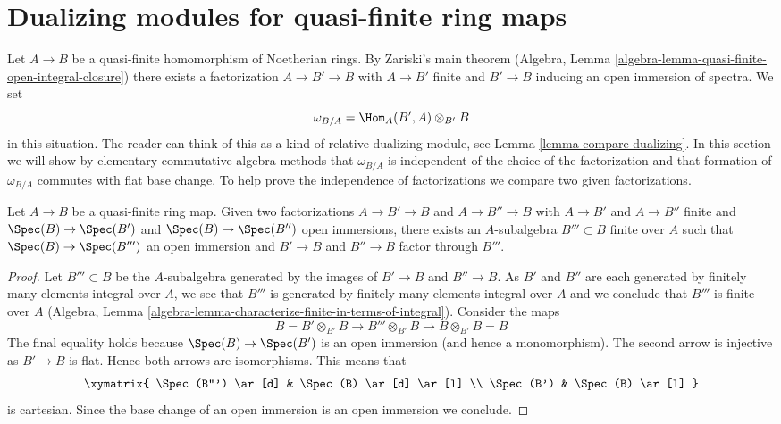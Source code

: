\section{Dualizing modules for quasi-finite ring maps}
\label{section-quasi-finite-dualizing}

\noindent
Let $A \to B$ be a quasi-finite homomorphism of Noetherian rings. By
Zariski's main theorem
(Algebra, Lemma \ref{algebra-lemma-quasi-finite-open-integral-closure})
there exists a factorization $A \to B' \to B$ with
$A \to B'$ finite and $B' \to B$ inducing an open immersion of spectra.
We set
\begin{equation}
\label{equation-dualizing}
\omega_{B/A} = \Hom_A(B', A) \otimes_{B'} B
\end{equation}
in this situation. The reader can think of this as a kind of relative
dualizing module, see Lemma \ref{lemma-compare-dualizing}.
In this section we will show by elementary commutative algebra methods
that $\omega_{B/A}$ is independent of the choice of the factorization
and that formation of $\omega_{B/A}$ commutes with flat base change.
To help prove the independence of factorizations we compare two
given factorizations.

\begin{lemma}
\label{lemma-dominate-factorizations}
Let $A \to B$ be a quasi-finite ring map. Given two factorizations
$A \to B' \to B$ and $A \to B'' \to B$ with
$A \to B'$ and $A \to B''$ finite and $\Spec(B) \to \Spec(B')$
and $\Spec(B) \to \Spec(B'')$ open immersions, there exists
an $A$-subalgebra $B''' \subset B$ finite over $A$ such that
$\Spec(B) \to \Spec(B''')$ an open immersion and $B' \to B$ and
$B'' \to B$ factor through $B'''$.
\end{lemma}

\begin{proof}
Let $B''' \subset B$ be the $A$-subalgebra generated by the images
of $B' \to B$ and $B'' \to B$. As $B'$ and $B''$ are each generated
by finitely many elements integral over $A$, we see that $B'''$ is
generated by finitely many elements integral over $A$ and we conclude
that $B'''$ is finite over $A$
(Algebra, Lemma \ref{algebra-lemma-characterize-finite-in-terms-of-integral}).
Consider the maps
$$
B = B' \otimes_{B'} B \to B''' \otimes_{B'} B \to B \otimes_{B'} B = B
$$
The final equality holds because $\Spec(B) \to \Spec(B')$ is an
open immersion (and hence a monomorphism). The second arrow is injective
as $B' \to B$ is flat. Hence both arrows are isomorphisms.
This means that
$$
\xymatrix{
\Spec(B''') \ar[d] & \Spec(B) \ar[d] \ar[l] \\
\Spec(B') & \Spec(B) \ar[l]
}
$$
is cartesian. Since the base change of an open immersion is an
open immersion we conclude.
\end{proof}


